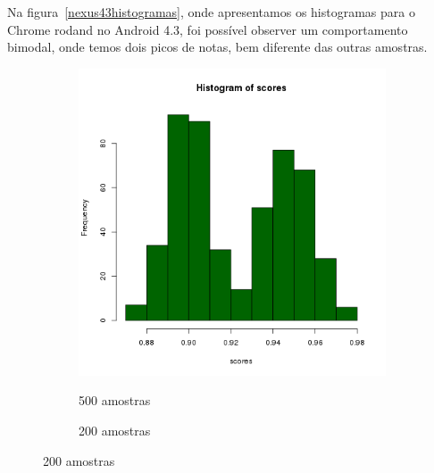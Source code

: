 \documentclass[11pt,a4paper]{article}
\begin{document}
Na figura~\ref{nexus43histogramas}, onde apresentamos os histogramas para o Chrome rodand no Android 4.3, foi possível
observer um comportamento bimodal, onde temos dois picos de notas, bem diferente das outras amostras.

\begin{figure}[H]
    \caption{Histogramas - Nexus 7, Android 4.3 Chrome}
    \label{nexus43histogramas}
    \begin{subfigure}{.5\textwidth}
        \caption{500 amostras}
        \centering
        \includegraphics[width=\textwidth]{images/hist-freq-n7-a43-chrome-500-amostras-20131119}
        \label{nexus43histograma500}
    \end{subfigure}
    \begin{subfigure}{.5\textwidth}
        \caption{200 amostras}
        \centering

\end{subfigure}
\end{figure}
\end{document}
